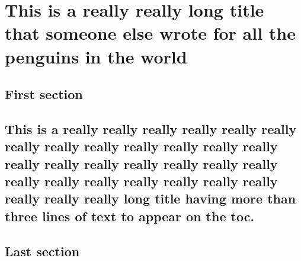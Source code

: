 \chapter{This is a really really long title that someone else wrote for all the penguins in the world}
\lipsum[2]
	
\section{First section}
\lipsum[3]

\section{This is a really really really really really really really really really really really really really really really really really really really really really really really really really really really really really really long title having more than three lines of text to appear on the toc.}
\lipsum[3-4]

	 
\section{Last section} 
\lipsum[4]
